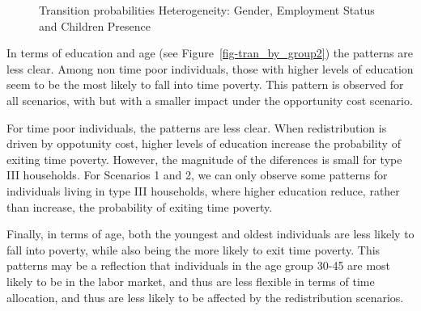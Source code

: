 \documentclass[
  11pt,
]{article}
\begin{document}
\begin{figure}[H]


\caption{\label{fig-tran_by_group1}Transition probabilities
Heterogeneity: Gender, Employment Status and Children Presence}

\end{figure}%

In terms of education and age (see Figure~\ref{fig-tran_by_group2}) the
patterns are less clear. Among non time poor individuals, those with
higher levels of education seem to be the most likely to fall into time
poverty. This pattern is observed for all scenarios, with but with a
smaller impact under the opportunity cost scenario.

For time poor individuals, the patterns are less clear. When
redistribution is driven by oppotunity cost, higher levels of education
increase the probability of exiting time poverty. However, the magnitude
of the diferences is small for type III households. For Scenarios 1 and
2, we can only observe some patterns for individuals living in type III
households, where higher education reduce, rather than increase, the
probability of exiting time poverty.

Finally, in terms of age, both the youngest and oldest individuals are
less likely to fall into poverty, while also being the more likely to
exit time poverty. This patterns may be a reflection that individuals in
the age group 30-45 are most likely to be in the labor market, and thus
are less flexible in terms of time allocation, and thus are less likely
to be affected by the redistribution scenarios.
\end{document}
